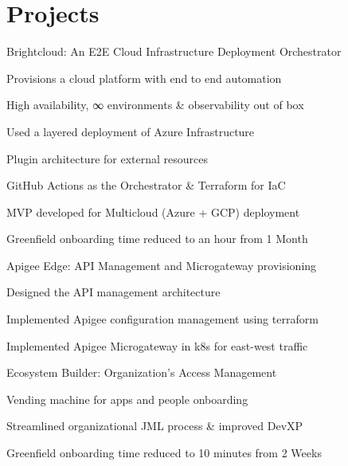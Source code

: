 \documentclass[]{de-resume}
\begin{document}
\begin{minipage}[t]{0.66\textwidth} 


\section{Projects}
\subsectionsep
{}
\subsectionsep
\begin{tightemize}
\item Brightcloud: An E2E Cloud Infrastructure Deployment Orchestrator
	\begin{tightemize}
		\sectionsep
		\item Provisions a cloud platform with end to end automation
		\item High availability, ∞ environments \& observability out of box
		\item Used a layered deployment of Azure Infrastructure
		\item Plugin architecture for external resources
		\item GitHub Actions as the Orchestrator \& Terraform for IaC 
		\item MVP developed for Multicloud (Azure + GCP) deployment 
		\item Greenfield onboarding time reduced to an hour from 1 Month
		\sectionsep
	\end{tightemize}

\item Apigee Edge: API Management and Microgateway provisioning 
\begin{tightemize}
	\sectionsep
	\item Designed the API management architecture
	\item Implemented Apigee configuration management using terraform
	\item Implemented Apigee Microgateway in k8s for east-west traffic
	\sectionsep
\end{tightemize}

\item Ecosystem Builder: Organization's Access Management
\begin{tightemize}
	\sectionsep
	\item Vending machine for apps and people onboarding
	\item Streamlined organizational JML process \& improved DevXP
	\item Greenfield onboarding time reduced to 10 minutes from 2 Weeks
	\sectionsep
\end{tightemize}


\end{tightemize}
\end{minipage}
\end{document}

